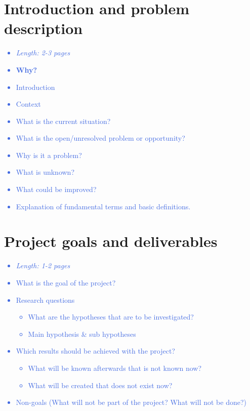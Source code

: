 \documentclass[a4paper,11pt]{article}
\providecommand*{\note}[1]{\small \textcolor{RoyalBlue}{\begin{minipage}{\textwidth}{#1}\end{minipage}}}
\begin{document}
\section{Introduction and problem description}
\label{sect:intro}

\note{
\begin{itemize}
	\item {\em Length: 2-3 pages}
	\item {\bf Why?}
	\item Introduction
	\item Context
	\item What is the current situation?
	\item What is the open/unresolved problem or opportunity?
	\item Why is it a problem?
	\item What is unknown?
	\item What could be improved?
	\item Explanation of fundamental terms and basic definitions.
\end{itemize}
}

\section{Project goals and deliverables}
\label{sect:goals}

\note{
\begin{itemize}
	\item {\em Length: 1-2 pages}
	\item What is the goal of the project?
	\item Research questions
	\begin{itemize}
		\item 	    What are the hypotheses that are to be investigated?
		\item 	    Main hypothesis \& sub hypotheses
	\end{itemize}
	\item Which results should be achieved with the project?
	\begin{itemize}
	    	\item 	   What will be known afterwards that is not known now?
		\item	    What will be created that does not exist now?
	\end{itemize}
	\item Non-goals (What will not be part of the project? What will not be done?)
\end{itemize}
}
\end{document}
